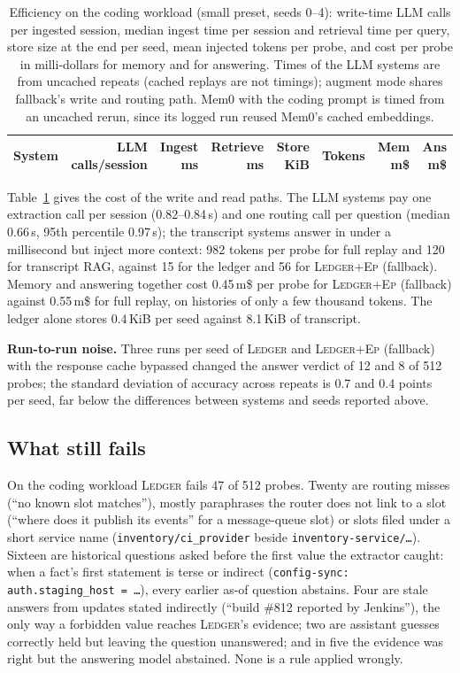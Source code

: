 \documentclass[10pt,conference]{IEEEtran}
\newcommand{\sys}{\textsc{Ledger}}
\newcommand{\hyb}{\textsc{Ledger+Ep}}
\begin{document}
\begin{table}[t]
\caption{Efficiency on the coding workload (small preset, seeds 0--4):
write-time LLM calls per ingested session, median ingest time per session and
retrieval time per query, store size at the end per seed, mean injected tokens
per probe, and cost per probe in milli-dollars for memory and for answering.
Times of the LLM systems are from uncached repeats (cached replays are not
timings); augment mode shares fallback's write and routing path. Mem0 with the
coding prompt is timed from an uncached rerun, since its logged run reused Mem0's cached embeddings.}
\label{tab:efficiency}
\centering
\footnotesize
\begin{tabular}{@{}lrrrrrrr@{}}
\toprule
System & LLM calls/session & Ingest ms & Retrieve ms & Store KiB & Tokens & Mem m\$ & Ans m\$ \\
\midrule

\bottomrule
\end{tabular}
\end{table}

Table~\ref{tab:efficiency} gives the cost of the write and read paths. The
LLM systems pay one extraction call per session (0.82--0.84\,s) and one
routing call per question (median 0.66\,s, 95th percentile 0.97\,s); the
transcript systems answer in under a millisecond but inject more context:
982 tokens per probe for full replay and 120 for transcript RAG, against 15
for the ledger and 56 for \hyb{} (fallback). Memory and answering together cost 0.45\,m\$ per probe for \hyb{}
(fallback) against 0.55\,m\$ for full replay, on histories of only a few
thousand tokens. The ledger alone stores 0.4\,KiB per seed against 8.1\,KiB of
transcript.

\textbf{Run-to-run noise.} Three runs per seed of \sys{} and \hyb{}
(fallback) with the response cache bypassed changed the answer verdict of
12 and 8 of 512 probes; the standard deviation of accuracy across repeats is
0.7 and 0.4 points per seed, far below the differences between systems and
seeds reported above.

\subsection{What still fails}

On the coding workload \sys{} fails 47 of 512 probes. Twenty are routing
misses (``no known slot matches''), mostly paraphrases the router does not
link to a slot (``where does it publish its events'' for a message-queue
slot) or slots filed under a short service name (\texttt{inventory/ci\_provider}
beside \texttt{inventory-service/\ldots}). Sixteen are historical questions
asked before the first value the extractor caught: when a fact's first
statement is terse or indirect (\texttt{config-sync: auth.staging\_host =
\ldots}), every earlier as-of question abstains. Four are stale answers from
updates stated indirectly (``build \#812 reported by Jenkins''), the only way
a forbidden value reaches \sys{}'s evidence; two are assistant guesses
correctly held but leaving the question unanswered; and in five the evidence
was right but the answering model abstained. None is a rule applied wrongly.
\end{document}
